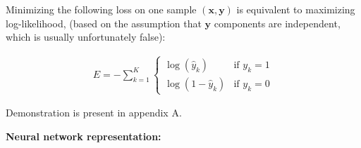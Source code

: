 Minimizing the following loss on one sample $(\mathbf{x}, \mathbf{y})$ is equivalent to maximizing log-likelihood, (based on the assumption that $\mathbf{y}$ components are independent, which is usually unfortunately false):

\begin{align}
	E = - \sum_{k=1}^K
  			  	\left\{
				    \begin{array}{ll}
				        \log (\hat y_k) & \mbox{if } y_k =1 \\
				        \log (1 - \hat y_k) & \mbox{if } y_k =0
				    \end{array}
				\right.
\end{align}

Demonstration is present in appendix A.

\textbf{Neural network representation:}

